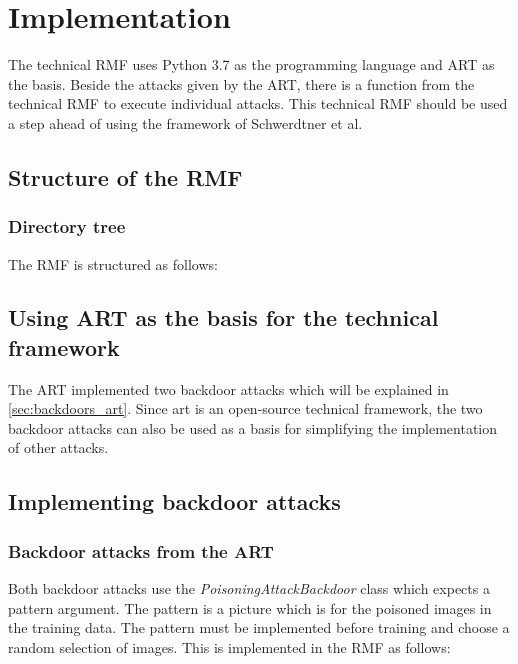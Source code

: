 \section{Implementation}
\label{sec:implementation}

The technical RMF uses Python 3.7 as the programming language and ART as the basis. Beside the attacks given by the ART, there is a function from the technical RMF to execute individual attacks. This technical RMF should be used a step ahead of using the framework of Schwerdtner et al.

\subsection{Structure of the RMF}

\subsubsection*{Directory tree}

The RMF is structured as follows:


\subsection{Using ART as the basis for the technical framework}

The ART implemented two backdoor attacks which will be explained in \ref{sec:backdoors_art}. Since art is an open-source technical framework, the two backdoor attacks can also be used as a basis for simplifying the implementation of other attacks.

\subsection{Implementing backdoor attacks}

\subsubsection*{Backdoor attacks from the ART}
\label{sec:backdoors_art}

Both backdoor attacks use the \textit{PoisoningAttackBackdoor} class which expects a pattern argument. The pattern is a picture which is for the poisoned images in the training data. The pattern must be implemented before training and choose a random selection of images. This is implemented in the RMF as follows:

